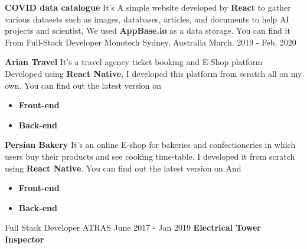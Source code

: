\begin{cventries}
{        \textcolor{primary}{\textbf{COVID data catalogue}}\break
        {It's A simple website developed by \textbf{React} to gather various datasets such as images, databases, articles, and documents to help AI projects and scientist, We used \textbf{AppBase.io} as a data storage. You can find it From }\break
        \break
    }
  \cventry
    {Full-Stack Developer} %
    {Monotech } %
    {Sydney, Australia} %
    {March. 2019 - Feb. 2020} %
    {
        \textcolor{primary}{\textbf{Arian Travel}}\break
        {It's a travel agency ticket booking and E-Shop platform Developed using \textbf{React Native}, I developed this platform from scratch all on my own. You can find out the latest version on }
        \begin{itemize}
            \item \textbf{Front-end} 
            \item \textbf{Back-end}  
        \end{itemize}
        \textcolor{primary}{\textbf{Persian Bakery}}\break
        {It's an online E-shop for bakeries and confectioneries in which users buy their products and see cooking time-table. I developed it from scratch using \textbf{React Native}. You can find out the latest version on  And }
        \begin{itemize}
            \item \textbf{Front-end} 
            \item \textbf{Back-end}  
        \end{itemize}
    }
  \cventry
    {Full Stack Developer} %
    {ATRAS} %
    {} %
    {June 2017 - Jan 2019} %
    {
        \textcolor{primary}{\textbf{Electrical Tower Inspector}}\break
}
\end{cventries}
